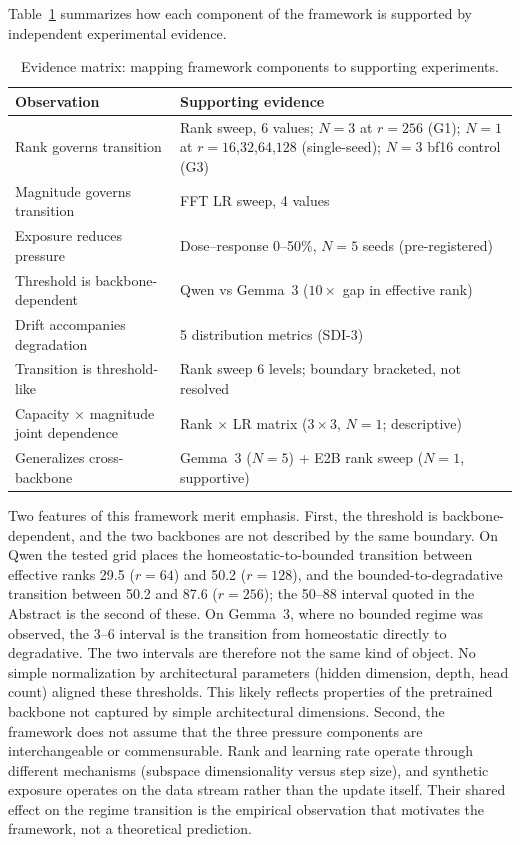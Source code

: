 \documentclass[a4paper,fleqn]{cas-dc}
\newif\ifshowchanges
\newcommand{\rev}[1]{\ifshowchanges{\color{blue}#1}\else{#1}\fi}
\renewcommand{\arraystretch}{1.8}
\begin{document}
Table~\ref{tab:evidence} summarizes how each component of the framework is
supported by independent experimental evidence.

\begin{table}[!htbp]
\caption{Evidence matrix: mapping framework components to supporting
experiments.}\label{tab:evidence}
\footnotesize
\renewcommand{\arraystretch}{1.4}
\begin{tabularx}{\columnwidth}{@{}lX@{}}
\toprule
\textbf{Observation} & \textbf{Supporting evidence} \\
\midrule
Rank governs transition & Rank sweep, 6 values; $N{=}3$ at $r{=}256$ (G1); $N{=}1$ at $r{=}16$,$32$,$64$,$128$ (single-seed); $N{=}3$ bf16 control (G3) \\
\addlinespace
Magnitude governs transition & FFT LR sweep, 4 values \\
\addlinespace
Exposure reduces pressure & Dose--response 0--50\%, $N{=}5$ seeds (pre-registered) \\
\addlinespace
Threshold is backbone-dependent & Qwen vs Gemma~3 ($10{\times}$ gap in effective rank) \\
\addlinespace
Drift accompanies degradation & 5 distribution metrics (SDI-3) \\
\addlinespace
Transition is threshold-like & Rank sweep 6 levels; boundary bracketed, not resolved \\
\addlinespace
Capacity $\times$ magnitude joint dependence & Rank $\times$ LR matrix ($3{\times}3$, $N{=}1$; descriptive) \\
\addlinespace
Generalizes cross-backbone & Gemma~3 ($N{=}5$) + E2B rank sweep ($N{=}1$, supportive) \\
\bottomrule
\end{tabularx}
\end{table}

Two features of this framework merit emphasis. First, the threshold is backbone-dependent, and the two backbones are
not described by the same boundary. \rev{On Qwen the tested grid places
the homeostatic-to-bounded transition between effective ranks 29.5
($r=64$) and 50.2 ($r=128$), and the bounded-to-degradative transition
between 50.2 and 87.6 ($r=256$); the 50--88 interval quoted in the
Abstract is the second of these. On Gemma~3, where no bounded regime
was observed, the 3--6 interval is the transition from homeostatic
directly to degradative. The two intervals are therefore not the same
kind of object.}
No simple normalization by architectural
parameters (hidden dimension, depth, head count) aligned these thresholds. This
likely reflects properties of the pretrained backbone not captured by simple
architectural dimensions. Second, the framework does not assume that the three
pressure components are interchangeable or commensurable. Rank and learning rate
operate through different mechanisms (subspace dimensionality versus step size),
and synthetic exposure operates on the data stream rather than the update
itself. Their shared effect on the regime transition is the empirical
observation that motivates the framework, not a theoretical prediction.
\end{document}

